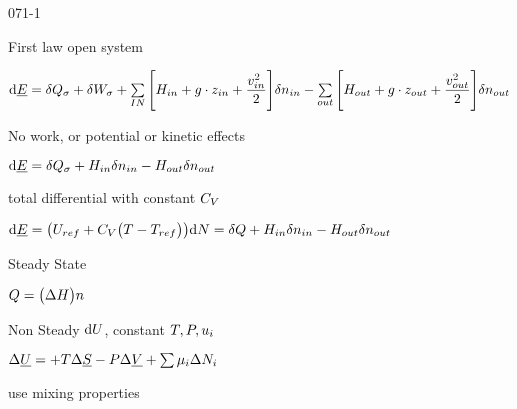 \begin{mitframe}{071-1}
\begin{listone}
	\item First law open system
    	\begin{listtwo}
        	\item $\mathrm{d}\uline{\energy}=\blthick\heatflow_{\molecrad}+\blthick\work_{\molecrad}+\sum\limits_{IN}\Bigg[\enthalpy_{in}+\grav\cdot{z}_{in}+\dfrac{\vvel_{in}^2}{2}\Bigg]\blthick{n}_{in}-\sum\limits_{out}\Bigg[\enthalpy_{out}+\grav\cdot{z}_{out}+\dfrac{\vvel_{out}^2}{2}\Bigg]\blthick{n}_{out}$
         \item No work, or potential or kinetic effects
         	\begin{listthree}
            \item $\mathrm{d}\uline{\energy}=\blthick
            \heatflow_{\molecrad}+\enthalpy_{in}\blthick{n}_{in}-\enthalpy_{out}\blthick{n}_{out}$
            	\begin{listfour}
                	\item total differential with constant $\cv$
                    \item $\mathrm{d}\uline{\energy}=\big(\uvel_{ref}+\cv\big(\Temp-\Temp_{ref}\big)\big)\mathrm{d}\nummoles=\blthick\heatflow+\enthalpy_{in}\blthick{n}_{in}-\enthalpy_{out}\blthick{n}_{out}$
                       \end{listfour}
            	\item Steady State
                	\begin{listfour}
                    \item $\heatflow=\big(\iipf\enthalpy\big){n}$
                    \end{listfour}
            	\item Non Steady $\mathrm{d}\uvel$, constant $\Temp, \p, \forcepot_{\state}$
            	\begin{listfour}
                	\item $\iipf\uline{\uvel}=+\Temp\iipf\stressvec-\p\iipf\uline{\vol}+\sum\nolimits\chempot_{\state}\iipf\nummoles_{\state}$
                    	\begin{listfive}
                        	\item use mixing properties
                        \end{listfive}
                \end{listfour}
            \end{listthree}

\end{listtwo}
\end{listone}
\end{mitframe}
